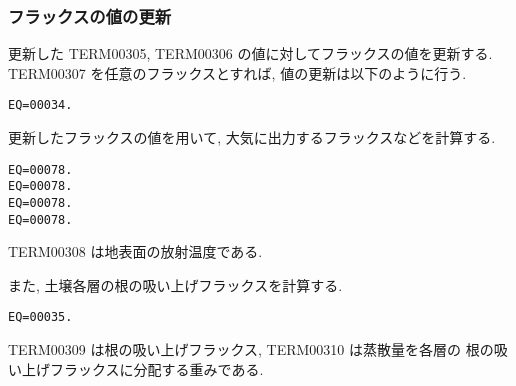 \subsubsection{フラックスの値の更新}

更新した TERM00305, TERM00306 の値に対してフラックスの値を更新する.
TERM00307 を任意のフラックスとすれば, 値の更新は以下のように行う.
\begin{verbatim}
EQ=00034.
\end{verbatim}

更新したフラックスの値を用いて, 大気に出力するフラックスなどを計算する.
\begin{verbatim}
EQ=00078.
EQ=00078.
EQ=00078.
EQ=00078.
\end{verbatim}
TERM00308 は地表面の放射温度である.

また, 土壌各層の根の吸い上げフラックスを計算する.
\begin{verbatim}
EQ=00035.
\end{verbatim}
TERM00309 は根の吸い上げフラックス, TERM00310 は蒸散量を各層の
根の吸い上げフラックスに分配する重みである.
